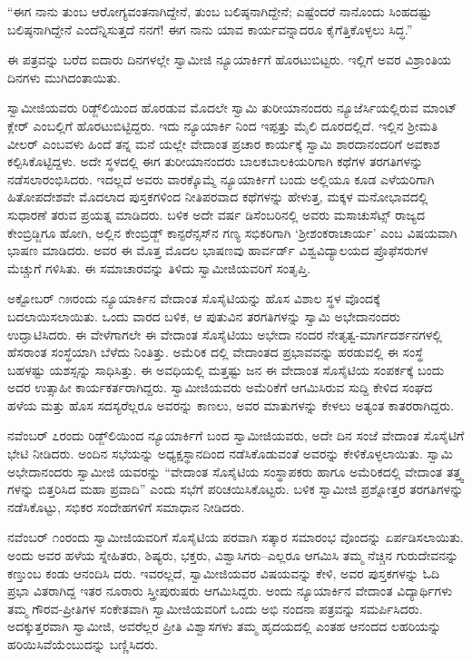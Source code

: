 “ಈಗ ನಾನು ತುಂಬ ಆರೋಗ್ಯವಂತನಾಗಿದ್ದೇನೆ, ತುಂಬ ಬಲಿಷ್ಠನಾಗಿದ್ದೇನೆ; ಎಷ್ಟೆಂದರೆ ನಾನೊಂದು ಸಿಂಹದಷ್ಟು ಬಲಿಷ್ಠನಾಗಿದ್ದೇನೆ ಎಂದೆನ್ನಿಸುತ್ತದೆ ನನಗೆ! ಈಗ ನಾನು ಯಾವ ಕಾರ್ಯವನ್ನಾದರೂ ಕೈಗೆತ್ತಿಕೊಳ್ಳಲು ಸಿದ್ಧ.”

ಈ ಪತ್ರವನ್ನು ಬರೆದ ಐದಾರು ದಿನಗಳಲ್ಲೇ ಸ್ವಾಮೀಜಿ ನ್ಯೂಯಾರ್ಕಿಗೆ ಹೊರಟುಬಿಟ್ಟರು. ಇಲ್ಲಿಗೆ ಅವರ ವಿಶ್ರಾಂತಿಯ ದಿನಗಳು ಮುಗಿದಂತಾಯಿತು.

ಸ್ವಾಮೀಜಿಯವರು ರಿಡ್ಜ್​ಲಿಯಿಂದ ಹೊರಡುವ ಮೊದಲೇ ಸ್ವಾಮಿ ತುರೀಯಾನಂದರು ನ್ಯೂಜೆರ್ಸಿಯಲ್ಲಿರುವ ಮಾಂಟ್ ಕ್ಲೇರ್ ಎಂಬಲ್ಲಿಗೆ ಹೊರಟುಬಿಟ್ಟಿದ್ದರು. ಇದು ನ್ಯೂಯಾರ್ಕಿ ನಿಂದ ಇಪ್ಪತ್ತು ಮೈಲಿ ದೂರದಲ್ಲಿದೆ. ಇಲ್ಲಿನ ಶ್ರೀಮತಿ ವೀಲರ್ ಎಂಬವಳು ಹಿಂದೆ ತನ್ನ ಮನೆ ಯಲ್ಲೇ ವೇದಾಂತ ಪ್ರಚಾರ ಕಾರ್ಯಕ್ಕೆ ಸ್ವಾಮಿ ಶಾರದಾನಂದರಿಗೆ ಅವಕಾಶ ಕಲ್ಪಿಸಿಕೊಟ್ಟಿದ್ದಳು. ಅದೇ ಸ್ಥಳದಲ್ಲಿ ಈಗ ತುರೀಯಾನಂದರು ಬಾಲಕಬಾಲಕಿಯರಿಗಾಗಿ ಕಥೆಗಳ ತರಗತಿಗಳನ್ನು ನಡೆಸಲಾರಂಭಿಸಿದರು. ಇದಲ್ಲದೆ ಅವರು ವಾರಕ್ಕೊಮ್ಮೆ ನ್ಯೂಯಾರ್ಕಿಗೆ ಬಂದು ಅಲ್ಲಿಯೂ ಕೂಡ ಎಳೆಯರಿಗಾಗಿ ಹಿತೋಪದೇಶವೇ ಮೊದಲಾದ ಪುಸ್ತಕಗಳಿಂದ ನೀತಿಪರವಾದ ಕಥೆಗಳನ್ನು ಹೇಳುತ್ತ, ಮಕ್ಕಳ ಮನೋಭಾವದಲ್ಲಿ ಸುಧಾರಣೆ ತರುವ ಪ್ರಯತ್ನ ಮಾಡಿದರು. ಬಳಿಕ ಅದೇ ವರ್ಷ ಡಿಸೆಂಬರಿನಲ್ಲಿ ಅವರು ಮಸಾಚುಸೆಟ್ಸ್ ರಾಜ್ಯದ ಕೇಂಬ್ರಿಡ್ಜಿಗೂ ಹೋಗಿ, ಅಲ್ಲಿನ ಕೇಂಬ್ರಿಡ್ಜ್ ಕಾನ್ಫರೆನ್ಸಸ್​ನ ಗಣ್ಯ ಸಭಿಕರಿಗಾಗಿ ‘ಶ್ರೀಶಂಕರಾಚಾರ್ಯ’ ಎಂಬ ವಿಷಯವಾಗಿ ಭಾಷಣ ಮಾಡಿದರು. ಅವರ ಈ ಮೊತ್ತ ಮೊದಲ ಭಾಷಣವು ಹಾರ್ವರ್ಡ್ ವಿಶ್ವವಿದ್ಯಾಲಯದ ಪ್ರೊಫೆಸರುಗಳ ಮೆಚ್ಚುಗೆ ಗಳಿಸಿತು. ಈ ಸಮಾಚಾರವನ್ನು ತಿಳಿದು ಸ್ವಾಮೀಜಿಯವರಿಗೆ ಸಂತೃಪ್ತಿ.

ಅಕ್ಟೋಬರ್ ೧೫ರಂದು ನ್ಯೂಯಾರ್ಕಿನ ವೇದಾಂತ ಸೊಸೈಟಿಯನ್ನು ಹೊಸ ವಿಶಾಲ ಸ್ಥಳ ವೊಂದಕ್ಕೆ ಬದಲಾಯಿಸಲಾಯಿತು. ಒಂದು ವಾರದ ಬಳಿಕ, ಆ ಪುತುವಿನ ತರಗತಿಗಳನ್ನು ಸ್ವಾಮಿ ಅಭೇದಾನಂದರು ಉದ್ಘಾಟಿಸಿದರು. ಈ ವೇಳೆಗಾಗಲೇ ಈ ವೇದಾಂತ ಸೊಸೈಟಿಯು ಅಭೇದಾ ನಂದರ ನೇತೃತ್ವ-ಮಾರ್ಗದರ್ಶನಗಳಲ್ಲಿ ಹೆಸರಾಂತ ಸಂಸ್ಥೆಯಾಗಿ ಬೆಳೆದು ನಿಂತಿತ್ತು. ಅಮೆರಿಕ ದಲ್ಲಿ ವೇದಾಂತದ ಪ್ರಭಾವವನ್ನು ಹರಡುವಲ್ಲಿ ಈ ಸಂಸ್ಥೆ ಬಹಳಷ್ಟು ಯಶಸ್ಸನ್ನು ಸಾಧಿಸಿತ್ತು. ಈ ಅವಧಿಯಲ್ಲಿ ಮತ್ತಷ್ಟು ಜನ ಈ ವೇದಾಂತ ಸೊಸೈಟಿಯ ಸಂಪರ್ಕಕ್ಕೆ ಬಂದು ಅದರ ಉತ್ಸಾಹೀ ಕಾರ್ಯಕರ್ತರಾಗಿದ್ದರು. ಸ್ವಾಮೀಜಿಯವರು ಅಮೆರಿಕೆಗೆ ಆಗಮಿಸಿರುವ ಸುದ್ದಿ ಕೇಳಿದ ಸಂಘದ ಹಳೆಯ ಮತ್ತು ಹೊಸ ಸದಸ್ಯರೆಲ್ಲರೂ ಅವರನ್ನು ಕಾಣಲು, ಅವರ ಮಾತುಗಳನ್ನು ಕೇಳಲು ಅತ್ಯಂತ ಕಾತರರಾಗಿದ್ದರು.

ನವೆಂಬರ್ ೭ರಂದು ರಿಡ್ಜ್​ಲಿಯಿಂದ ನ್ಯೂಯಾರ್ಕಿಗೆ ಬಂದ ಸ್ವಾಮೀಜಿಯವರು, ಅದೇ ದಿನ ಸಂಜೆ ವೇದಾಂತ ಸೊಸೈಟಿಗೆ ಭೇಟಿ ನೀಡಿದರು. ಅಂದಿನ ಸಭೆಯನ್ನು ಅಧ್ಯಕ್ಷಸ್ಥಾನದಿಂದ ನಡೆಸಿಕೊಡುವಂತೆ ಅವರನ್ನು ಕೇಳಿಕೊಳ್ಳಲಾಯಿತು. ಸ್ವಾಮಿ ಅಭೇದಾನಂದರು ಸ್ವಾಮೀಜಿ ಯವರನ್ನು “ವೇದಾಂತ ಸೊಸೈಟಿಯ ಸಂಸ್ಥಾಪಕರು ಹಾಗೂ ಅಮೆರಿಕದಲ್ಲಿ ವೇದಾಂತ ತತ್ತ್ವ ಗಳನ್ನು ಬಿತ್ತರಿಸಿದ ಮಹಾ ಪ್ರವಾದಿ” ಎಂದು ಸಭೆಗೆ ಪರಿಚಯಿಸಿಕೊಟ್ಟರು. ಬಳಿಕ ಸ್ವಾಮೀಜಿ ಪ್ರಶ್ನೋತ್ತರ ತರಗತಿಗಳನ್ನು ನಡೆಸಿಕೊಟ್ಟು, ಸಭಿಕರ ಸಂದೇಹಗಳಿಗೆ ಸಮಾಧಾನ ನೀಡಿದರು.

ನವೆಂಬರ್ ೧ಂರಂದು ಸ್ವಾಮೀಜಿಯವರಿಗೆ ಸೊಸೈಟಿಯ ಪರವಾಗಿ ಸತ್ಕಾರ ಸಮಾರಂಭ ವೊಂದನ್ನು ಏರ್ಪಡಿಸಲಾಯಿತು. ಅಂದು ಅವರ ಹಳೆಯ ಸ್ನೇಹಿತರು, ಶಿಷ್ಯರು, ಭಕ್ತರು, ವಿಶ್ವಾಸಿಗರು–ಎಲ್ಲರೂ ಆಗಮಿಸಿ ತಮ್ಮ ನೆಚ್ಚಿನ ಗುರುದೇವನನ್ನು ಕಣ್ತುಂಬ ಕಂಡು ಆನಂದಿಸಿ ದರು. ಇವರಲ್ಲದೆ, ಸ್ವಾಮೀಜಿಯವರ ವಿಷಯವನ್ನು ಕೇಳಿ, ಅವರ ಪುಸ್ತಕಗಳನ್ನು ಓದಿ ಪ್ರಭಾ ವಿತರಾಗಿದ್ದ ಇತರ ನೂರಾರು ಸ್ತ್ರೀಪುರುಷರು ಆಗಮಿಸಿದ್ದರು. ಅಂದು ನ್ಯೂಯಾರ್ಕಿನ ವೇದಾಂತ ವಿದ್ಯಾರ್ಥಿಗಳು ತಮ್ಮ ಗೌರವ-ಪ್ರೀತಿಗಳ ಸಂಕೇತವಾಗಿ ಸ್ವಾಮೀಜಿಯವರಿಗೆ ಒಂದು ಅಭಿ ನಂದನಾ ಪತ್ರವನ್ನು ಸಮರ್ಪಿಸಿದರು. ಅದಕ್ಕುತ್ತರವಾಗಿ ಸ್ವಾಮೀಜಿ, ಅವರೆಲ್ಲರ ಪ್ರೀತಿ ವಿಶ್ವಾಸಗಳು ತಮ್ಮ ಹೃದಯದಲ್ಲಿ ಎಂತಹ ಆನಂದದ ಲಹರಿಯನ್ನು ಹರಿಯಿಸಿವೆಯೆಂಬುದನ್ನು ಬಣ್ಣಿಸಿದರು.

